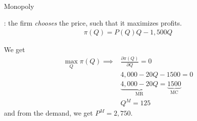 \begin{frame}{Monopoly}

    : the firm \textit{chooses} the price, such that it maximizes profits.
    \begin{align*}
        \pi(Q) = P(Q)Q - 1,500Q
    \end{align*}

    We get
    \begin{align*}
        \max_{Q} \pi(Q) \implies &\frac{\partial \pi(Q)}{\partial Q} = 0\\
        &4,000 - 20 Q -1500 = 0\\
        & \underbrace{4,000 - 20 Q}_{\text{MR}} = \underbrace{1500}_{\text{MC}} \\
        & Q^{M} = 125
    \end{align*}
    and from the demand, we get $P^{M} = 2,750$.
    
\end{frame}
